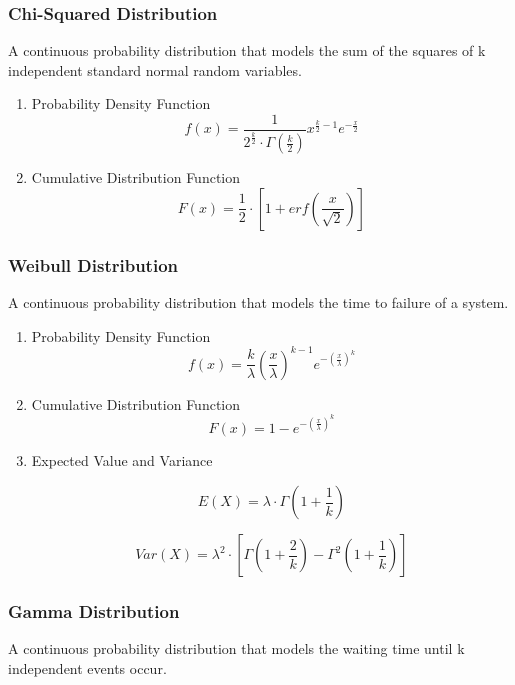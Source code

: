 \documentclass[11pt]{article}
\def\cheatsheetitemsep{-0.5em}
\let\olditem\item
\def\item{\vspace{\cheatsheetitemsep}\olditem}
\begin{document}
\subsubsection{Chi-Squared Distribution}
\label{sec:orgf0bd8b2}
A continuous probability distribution that models the sum of the squares of k independent standard normal random variables.

\begin{enumerate}
\item Probability Density Function
\label{sec:orgf3684c9}
\[
f(x) = \frac{1}{2^{\frac{k}{2}} \cdot \Gamma\left(\frac{k}{2}\right)} x^{\frac{k}{2}-1} e^{-\frac{x}{2}}
\]

\item Cumulative Distribution Function
\label{sec:orgef6f939}
\[
F(x) = \frac{1}{2} \cdot \left[1 + erf\left(\frac{x}{\sqrt{2}}\right)\right]
\]
\end{enumerate}



\subsubsection{Weibull Distribution}
\label{sec:org3373f1f}
A continuous probability distribution that models the time to failure of a system.

\begin{enumerate}
\item Probability Density Function
\label{sec:org432a55a}
\[
f(x) = \frac{k}{\lambda} \left(\frac{x}{\lambda}\right)^{k-1} e^{-\left(\frac{x}{\lambda}\right)^k}
\]

\item Cumulative Distribution Function
\label{sec:orgf8c66b2}
\[
F(x) = 1 - e^{-\left(\frac{x}{\lambda}\right)^k}
\]

\item Expected Value and Variance
\label{sec:org0593230}

\[
E(X) = \lambda \cdot \Gamma(1 + \frac{1}{k})
\]

\[
Var(X) = \lambda^2 \cdot \left[\Gamma(1 + \frac{2}{k}) - \Gamma^2(1 + \frac{1}{k})\right]
\]
\end{enumerate}

\subsubsection{Gamma Distribution}
\label{sec:org853d9c2}
A continuous probability distribution that models the waiting time until k independent events occur.
\end{document}
